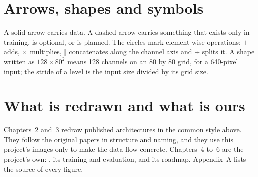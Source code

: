 \section{Arrows, shapes and symbols}

A solid arrow carries data. A dashed arrow carries something that exists only in training, is optional, or is
planned. The circles mark element-wise operations: $+$ adds, $\times$ multiplies, $\Vert$ concatenates along the
channel axis and $\div$ splits it. A shape written as $128\times80^2$ means 128 channels on an 80 by 80 grid, for a
640-pixel input; the stride of a level is the input size divided by its grid size.

\section{What is redrawn and what is ours}

Chapters~2 and~3 redraw published architectures in the common style above. They follow the original papers in
structure and naming, and they use this project's images only to make the data flow concrete. Chapters~4 to~6 are
the project's own: \method{}, its training and evaluation, and its roadmap. Appendix~A lists the source of every
figure.
